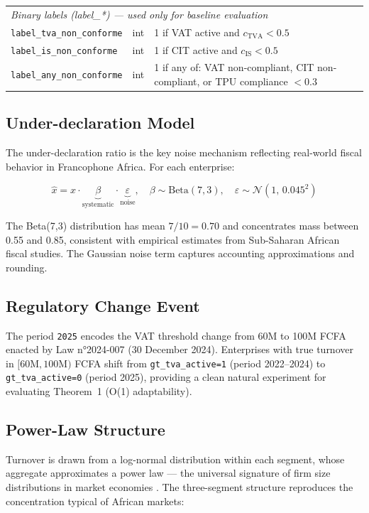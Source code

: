 \begin{longtable}{lp{2.2cm}p{6cm}}
\multicolumn{3}{l}{\textit{Binary labels (label\_*) --- used only for baseline evaluation}} \\[2pt]
\texttt{label\_tva\_non\_conforme} & int & 1 if VAT active and $c_{\text{TVA}} < 0.5$ \\
\texttt{label\_is\_non\_conforme} & int & 1 if CIT active and $c_{\text{IS}} < 0.5$ \\
\texttt{label\_any\_non\_conforme} & int & 1 if any of: VAT non-compliant, CIT non-compliant, or TPU compliance $< 0.3$ \\

\end{longtable}

\subsection{Under-declaration Model}

The under-declaration ratio is the key noise mechanism reflecting
real-world fiscal behavior in Francophone Africa. For each enterprise:

\[
  \hat{x} = x \cdot \underbrace{\beta}_{\text{systematic}} \cdot
  \underbrace{\varepsilon}_{\text{noise}}, \quad
  \beta \sim \text{Beta}(7, 3), \quad
  \varepsilon \sim \mathcal{N}(1,\, 0.045^2)
\]

The Beta(7,3) distribution has mean $7/10 = 0.70$ and concentrates
mass between 0.55 and 0.85, consistent with empirical estimates from
Sub-Saharan African fiscal studies. The Gaussian noise term captures
accounting approximations and rounding.

\subsection{Regulatory Change Event}

The period \texttt{2025} encodes the VAT threshold change from 60M to
100M FCFA enacted by Law n°2024-007 (30 December 2024). Enterprises
with true turnover in $[60\text{M}, 100\text{M})$ FCFA shift from
\texttt{gt\_tva\_active=1} (period 2022--2024) to \texttt{gt\_tva\_active=0}
(period 2025), providing a clean natural experiment for evaluating
Theorem~1 (O(1) adaptability).

\subsection{Power-Law Structure}

Turnover is drawn from a log-normal distribution within each segment,
whose aggregate approximates a power law --- the universal signature
of firm size distributions in market economies \cite{gabaix2009power}.
The three-segment structure reproduces the concentration typical of
African markets:

